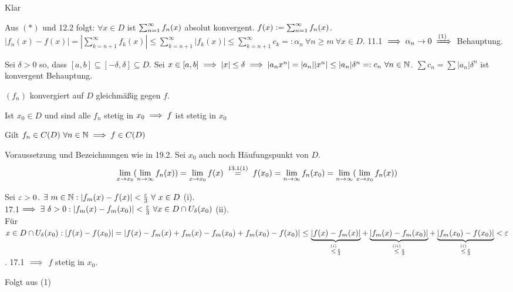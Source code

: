 \documentclass[a4paper,oneside,DIV15,BCOR12mm]{scrbook}
\begin{document}
\begin{beweise}
\item Klar
\item Aus $(*)$ und 12.2 folgt: $\forall x\in D$ ist $\sum_{n=1}^{\infty}{f_n(x)}$ absolut konvergent. $f(x) := \sum_{n=1}^{\infty}{f_n(x)}$. $|f_n(x) - f(x)| = |\sum_{k=n+1}^\infty f_k(x)| \le \sum_{k=n+1}^\infty |f_k(x)| \le \sum_{k=n+1}^\infty c_k =: \alpha_n \ \forall n\ge m \ \forall x \in D$. 11.1 $\folgt \alpha_n \to 0 \folgtnach{(1)}$ Behauptung.
\item Sei $\delta>0$ so, dass $[a,b] \subseteq [-\delta, \delta] \subseteq D$. Sei $x\in[a,b] \implies |x| \le \delta \implies |a_nx^n| = |a_n||x^n| \le |a_n|\delta^n =: c_n \ \forall n\in\mathbb{N}$. $\sum{c_n} = \sum{|a_n|\delta^n}$ ist konvergent  Behauptung.
\end{beweise}

\begin{satz}
$(f_n)$ konvergiert auf $D$ gleichmäßig gegen $f$.
\begin{liste}
\item Ist $x_0\in D$ und sind alle $f_n$ stetig in $x_0 \implies f$ ist stetig in $x_0$
\item Gilt $f_n \in C(D) \ \forall n\in\mathbb{N} \implies f \in C(D)$
\end{liste}
\end{satz}

\begin{bemerkung}
Voraussetzung und Bezeichnungen wie in 19.2. Sei $x_0$ auch noch Häufungspunkt von $D$.
$$ \lim_{x\to x_0} (\lim_{n\to\infty} f_n(x)) = \lim_{x\to x_0}f(x) \gleichnach{13.1(1)}f(x_0) = \lim_{n\to\infty} f_n(x_0) = \lim_{n\to\infty} (\lim_{x\to x_0} f_n(x))$$
\end{bemerkung}

\begin{beweise}
\item Sei $\varepsilon>0$. $\exists\ m \in\MdN: |f_m(x)-f(x)|<\frac{\ep}{3}\ \forall\ x\in D$ (i).\\
 17.1$\implies \exists\ \delta>0: |f_m(x)-f_m(x_0)|<\frac{\varepsilon}{3}\ \forall x \in D \cap U_{\delta}(x_0)$ (ii). \\
 Für $x \in D\cap U_{\delta}(x_0): |f(x)-f(x_0)|=|f(x)-f_m(x)+f_m(x)-f_m(x_0)+f_m(x_0)-f(x_0)|\le \underbrace{|f(x)-f_m(x)|}_{\stackrel{(i)}{\le}\frac{\varepsilon}{3}}+\underbrace{|f_m(x)-f_m(x_0)|}_{\stackrel{(ii)}{\le}\frac{\varepsilon}{3}}+\underbrace{|f_m(x_0)-f(x_0)|}_{\stackrel{(i)}{\le}\frac{\varepsilon}{3}}<\varepsilon$. 17.1 $\implies$ $f$ stetig in $x_0$.
\item Folgt aus (1)
\end{beweise}
\end{document}
